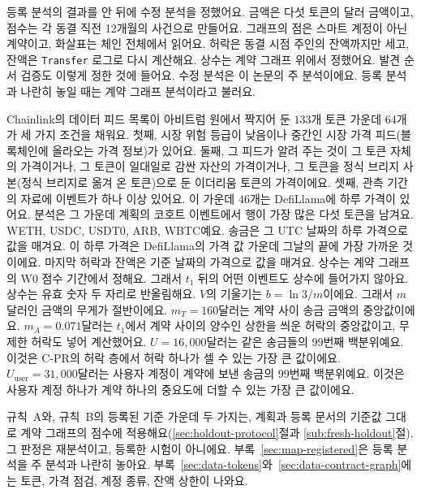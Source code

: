 등록 분석의 결과를 안 뒤에 수정 분석을 정했어요. 금액은 다섯 토큰의 달러 금액이고, 점수는 각 동결 직전 12개월의 사건으로 만들어요. 그래프의 점은 스마트 계정이 아닌 계약이고, 화살표는 체인 전체에서 읽어요. 허락은 동결 시점 주인의 잔액까지만 세고, 잔액은 \texttt{Transfer} 로그로 다시 계산해요. 상수는 계약 그래프 위에서 정했어요. 발견 순서 검증도 이렇게 정한 것에 들어요. 수정 분석은 이 논문의 주 분석이에요. 등록 분석과 나란히 놓일 때는 계약 그래프 분석이라고 불러요.

Chainlink의 데이터 피드 목록이 아비트럼 원에서 짝지어 둔 $133$개 토큰 가운데 $64$개가 세 가지 조건을 채워요. 첫째, 시장 위험 등급이 낮음이나 중간인 시장 가격 피드(블록체인에 올라오는 가격 정보)가 있어요\parencite{chainlinknddatafeeds}. 둘째, 그 피드가 알려 주는 것이 그 토큰 자체의 가격이거나, 그 토큰이 일대일로 감싼 자산의 가격이거나, 그 토큰을 정식 브리지 사본(정식 브리지로 옮겨 온 토큰)으로 둔 이더리움 토큰의 가격이에요. 셋째, 관측 기간의 자료에 이벤트가 하나 이상 있어요. 이 가운데 $46$개는 DefiLlama에 하루 가격이 있어요\parencite{defillamanddocs}. 분석은 그 가운데 계획의 코호트 이벤트에서 행이 가장 많은 다섯 토큰을 남겨요. WETH, USDC, USDT0, ARB, WBTC예요. 송금은 그 UTC 날짜의 하루 가격으로 값을 매겨요. 이 하루 가격은 DefiLlama의 가격 값 가운데 그날의 끝에 가장 가까운 것이에요. 마지막 허락과 잔액은 기준 날짜의 가격으로 값을 매겨요. 상수는 계약 그래프의 W0 점수 기간에서 정해요. 그래서 $t_1$ 뒤의 어떤 이벤트도 상수에 들어가지 않아요. 상수는 유효 숫자 두 자리로 반올림해요. $V$의 기울기는 $b=\ln 3/m$이에요. 그래서 $m$달러인 금액의 무게가 절반이에요. $m_T=160$달러는 계약 사이 송금 금액의 중앙값이에요. $m_A=0.071$달러는 $t_1$에서 계약 사이의 양수인 상한을 씌운 허락의 중앙값이고, 무제한 허락도 넣어 계산했어요. $U=16{,}000$달러는 같은 송금들의 99번째 백분위예요. 이것은 \mbox{C-PR}의 허락 층에서 허락 하나가 셀 수 있는 가장 큰 값이에요. $U_{\mathrm{user}}=31{,}000$달러는 사용자 계정이 계약에 보낸 송금의 99번째 백분위예요. 이것은 사용자 계정 하나가 계약 하나의 중요도에 더할 수 있는 가장 큰 값이에요.

규칙~A와, 규칙~B의 등록된 기준 가운데 두 가지는, 계획과 등록 문서의 기준값 그대로 계약 그래프의 점수에 적용해요(\ref{sec:holdout-protocol}절과 \ref{sub:fresh-holdout}절). 그 판정은 재분석이고, 등록한 시험이 아니에요. 부록~\ref{sec:map-registered}은 등록 분석을 주 분석과 나란히 놓아요. 부록~\ref{sec:data-tokens}와~\ref{sec:data-contract-graph}에는 토큰, 가격 점검, 계정 종류, 잔액 상한이 나와요.


